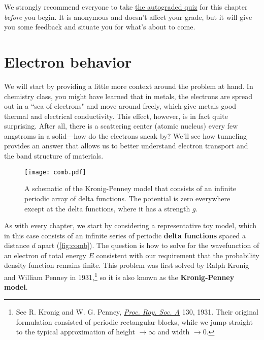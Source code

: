 \begin{tcolorbox}[colframe=PaloAlto, colbacktitle=PaloAlto!20!white, title=Self-check quiz]
	We strongly recommend everyone to take \href{https://forms.gle/n5kDHJ5TQud5K9UZA}{the autograded quiz} for this chapter \emph{before} you begin.
	It is anonymous and doesn't affect your grade, but it will give you some feedback and situate you for what's about to come.
\end{tcolorbox}


\section{Electron behavior}

We will start by providing a little more context around the problem at hand. 
In chemistry class, you might have learned that in metals, the electrons are spread out in a ``sea of electrons" and move around freely, which give metals good thermal and electrical conductivity. 
This effect, however, is in fact quite surprising. 
After all, there is a scattering center (atomic nucleus) every few angstroms in a solid---how do the electrons sneak by? 
We'll see how tunneling provides an answer that allows us to better understand electron transport and the band structure of materials. 

\begin{figure}[!h]
	\centering
	\texttt{[image: comb.pdf]}
	\caption{A schematic of the Kronig-Penney model that consists of an infinite periodic array of delta functions. 
	The potential is zero everywhere except at the delta functions, where it has a strength $g$.}
	\label{fig:comb}
\end{figure}

As with every chapter, we start by considering a representative toy model, which in this case consists of an infinite series of periodic \textbf{delta functions} spaced a distance $d$ apart (\autoref{fig:comb}). 
The question is how to solve for the wavefunction of an electron of total energy $E$ consistent with our requirement that the probability density function remains finite. 
This problem was first solved by Ralph Kronig and William Penney in 1931,\footnote{See R. Kronig and W. G. Penney, \href{http://rspa.royalsocietypublishing.org/content/130/814/499}{\emph{Proc. Roy. Soc. A}} 130, 1931. Their original formulation consisted of periodic rectangular blocks, while we jump straight to the typical approximation of height $\rightarrow\infty$ and width $\rightarrow0$.} so it is also known as the \textbf{Kronig-Penney model}.

